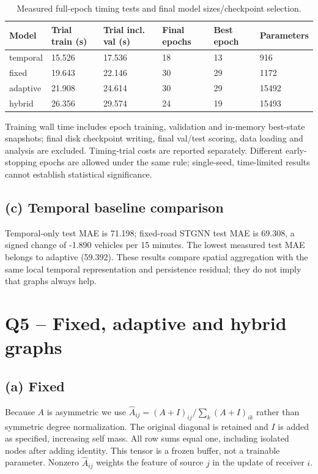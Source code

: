 \documentclass[11pt,a4paper]{article}
\begin{document}
\begin{table}[htbp]\centering\small\caption{Measured full-epoch timing tests and final model sizes/checkpoint selection.}\begin{tabular}{llllll}\toprule
Model & Trial train (s) & Trial incl. val (s) & Final epochs & Best epoch & Parameters\\\midrule
temporal & 15.526 & 17.536 & 18 & 13 & 916\\
fixed & 19.643 & 22.146 & 30 & 29 & 1172\\
adaptive & 21.908 & 24.614 & 30 & 29 & 15492\\
hybrid & 26.356 & 29.574 & 24 & 19 & 15493\\
\bottomrule\end{tabular}\end{table}
Training wall time includes epoch training, validation and in-memory best-state snapshots; final disk checkpoint writing, final val/test scoring, data loading and analysis are excluded. Timing-trial costs are reported separately. Different early-stopping epochs are allowed under the same rule; single-seed, time-limited results cannot establish statistical significance.

\subsection{(c) Temporal baseline comparison}
Temporal-only test MAE is 71.198; fixed-road STGNN test MAE is 69.308, a signed change of -1.890 vehicles per 15 minutes. The lowest measured test MAE belongs to adaptive (59.392). These results compare spatial aggregation with the same local temporal representation and persistence residual; they do not imply that graphs always help.

\section{Q5 -- Fixed, adaptive and hybrid graphs}\subsection{(a) Fixed}
Because $A$ is asymmetric we use $\widehat A_{ij}=(A+I)_{ij}/\sum_k(A+I)_{ik}$ rather than symmetric degree normalization. The original diagonal is retained and $I$ is added as specified, increasing self mass. All row sums equal one, including isolated nodes after adding identity. This tensor is a frozen buffer, not a trainable parameter. Nonzero $\widehat A_{ij}$ weights the feature of source $j$ in the update of receiver $i$.
\end{document}
